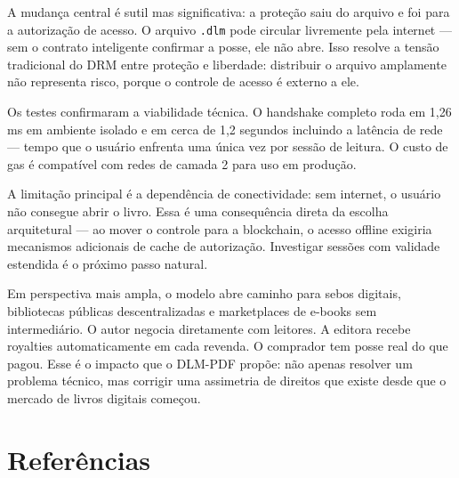 \documentclass[12pt]{article}
\begin{document}
A mudança central é sutil mas significativa: a proteção saiu do arquivo e foi para a autorização de acesso. O arquivo \texttt{.dlm} pode circular livremente pela internet — sem o contrato inteligente confirmar a posse, ele não abre. Isso resolve a tensão tradicional do DRM entre proteção e liberdade: distribuir o arquivo amplamente não representa risco, porque o controle de acesso é externo a ele.

Os testes confirmaram a viabilidade técnica. O handshake completo roda em 1,26 ms em ambiente isolado e em cerca de 1,2 segundos incluindo a latência de rede — tempo que o usuário enfrenta uma única vez por sessão de leitura. O custo de gas é compatível com redes de camada 2 para uso em produção.

A limitação principal é a dependência de conectividade: sem internet, o usuário não consegue abrir o livro. Essa é uma consequência direta da escolha arquitetural — ao mover o controle para a blockchain, o acesso offline exigiria mecanismos adicionais de cache de autorização. Investigar sessões com validade estendida é o próximo passo natural.

Em perspectiva mais ampla, o modelo abre caminho para sebos digitais, bibliotecas públicas descentralizadas e marketplaces de e-books sem intermediário. O autor negocia diretamente com leitores. A editora recebe royalties automaticamente em cada revenda. O comprador tem posse real do que pagou. Esse é o impacto que o DLM-PDF propõe: não apenas resolver um problema técnico, mas corrigir uma assimetria de direitos que existe desde que o mercado de livros digitais começou.

\section*{Referências}
\end{document}
